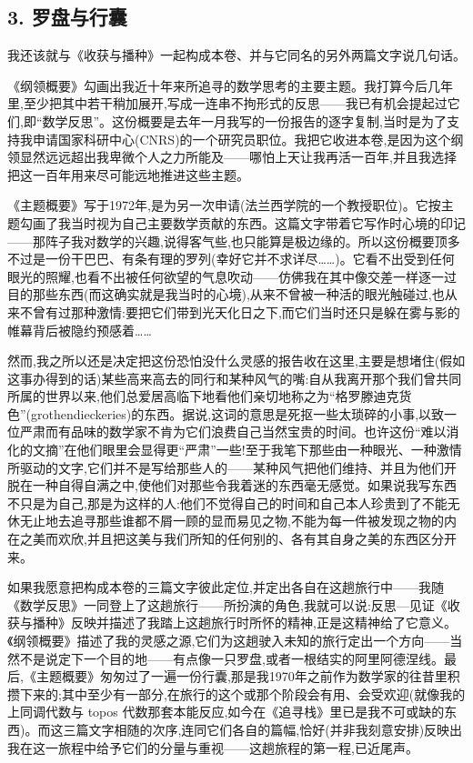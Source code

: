 
\subsection{3. 罗盘与行囊}

我还该就与《收获与播种》一起构成本卷、并与它同名的另外两篇文字说几句话。

《纲领概要》勾画出我近十年来所追寻的数学思考的主要主题。我打算今后几年里,至少把其中若干稍加展开,写成一连串不拘形式的反思——我已有机会提起过它们,即“数学反思”。这份概要是去年一月我写的一份报告的逐字复制,当时是为了支持我申请国家科研中心(CNRS)的一个研究员职位。我把它收进本卷,是因为这个纲领显然远远超出我卑微个人之力所能及——哪怕上天让我再活一百年,并且我选择把这一百年用来尽可能远地推进这些主题。

《主题概要》写于1972年,是为另一次申请(法兰西学院的一个教授职位)。它按主题勾画了我当时视为自己主要数学贡献的东西。这篇文字带着它写作时心境的印记——那阵子我对数学的兴趣,说得客气些,也只能算是极边缘的。所以这份概要顶多不过是一份干巴巴、有条有理的罗列(幸好它并不求详尽……)。它看不出受到任何眼光的照耀,也看不出被任何欲望的气息吹动——仿佛我在其中像交差一样逐一过目的那些东西(而这确实就是我当时的心境),从来不曾被一种活的眼光触碰过,也从来不曾有过那种激情:要把它们带到光天化日之下,而它们当时还只是躲在雾与影的帷幕背后被隐约预感着……

然而,我之所以还是决定把这份恐怕没什么灵感的报告收在这里,主要是想堵住(假如这事办得到的话)某些高来高去的同行和某种风气的嘴:自从我离开那个我们曾共同所属的世界以来,他们总爱居高临下地看他们亲切地称之为“格罗滕迪克货色”(grothendieckeries)的东西。据说,这词的意思是死抠一些太琐碎的小事,以致一位严肃而有品味的数学家不肯为它们浪费自己当然宝贵的时间。也许这份“难以消化的文摘”在他们眼里会显得更“严肃”一些!至于我笔下那些由一种眼光、一种激情所驱动的文字,它们并不是写给那些人的——某种风气把他们维持、并且为他们开脱在一种自得自满之中,使他们对那些令我着迷的东西毫无感觉。如果说我写东西不只是为自己,那是为这样的人:他们不觉得自己的时间和自己本人珍贵到了不能无休无止地去追寻那些谁都不屑一顾的显而易见之物,不能为每一件被发现之物的内在之美而欢欣,并且把这美与我们所知的任何别的、各有其自身之美的东西区分开来。

 如果我愿意把构成本卷的三篇文字彼此定位,并定出各自在这趟旅行中——我随《数学反思》一同登上了这趟旅行——所扮演的角色,我就可以说:反思—见证《收获与播种》反映并描述了我踏上这趟旅行时所怀的精神,正是这精神给了它意义。《纲领概要》描述了我的灵感之源,它们为这趟驶入未知的旅行定出一个方向——当然不是说定下一个目的地——有点像一只罗盘,或者一根结实的阿里阿德涅线。最后,《主题概要》匆匆过了一遍一份行囊,那是我1970年之前作为数学家的往昔里积攒下来的;其中至少有一部分,在旅行的这个或那个阶段会有用、会受欢迎(就像我的上同调代数与 topos 代数那套本能反应,如今在《追寻栈》里已是我不可或缺的东西)。而这三篇文字相随的次序,连同它们各自的篇幅,恰好(并非我刻意安排)反映出我在这一旅程中给予它们的分量与重视——这趟旅程的第一程,已近尾声。

